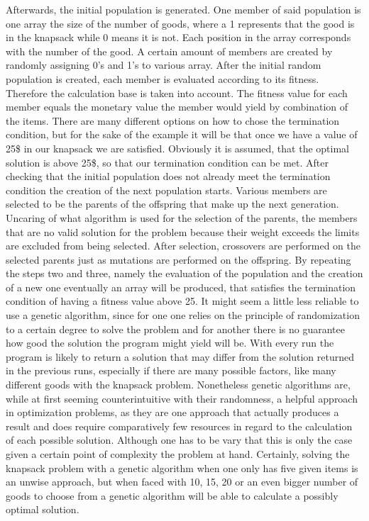 \documentclass[11pt,a4paper]{article}
\begin{document}
Afterwards, the initial population is generated. One member of said population is one array the size of the number of goods, where a 1 represents that the good is in the knapsack while 0 means it is not. Each position in the array corresponds with the number of the good. A certain amount of members are created by randomly assigning 0’s and 1’s to various array. After the initial random population is created, each member is evaluated according to its fitness. Therefore the calculation base is taken into account. The fitness value for each member equals the monetary value the member would yield by combination of the items.
There are many different options on how to chose the termination condition, but for the sake of the example it will be that once we have a value of 25\$ in our knapsack we are satisfied. Obviously it is assumed, that the optimal solution is above 25\$, so that our termination condition can be met.
After checking that the initial population does not already meet the termination condition the creation of the next population starts. Various members are selected to be the parents of the offspring that make up the next generation. Uncaring of what algorithm is used for the selection of the parents, the members that are no valid solution for the problem because their weight exceeds the limits are excluded from being selected.
After selection, crossovers are performed on the selected parents just as mutations are performed on the offspring.
By repeating the steps two and three, namely the evaluation of the population and the creation of a new one eventually an array will be produced, that satisfies the termination condition of having a fitness value above 25.
It might seem a little less reliable to use a genetic algorithm, since for one one relies on the principle of randomization to a certain degree to solve the problem and for another there is no guarantee how good the solution the program might yield will be. With every run the program is likely to return a solution that may differ from the solution returned in the previous runs, especially if there are many possible factors, like many different goods with the knapsack problem.
Nonetheless genetic algorithms are, while at first seeming counterintuitive with their randomness, a helpful approach in optimization problems, as they are one approach that actually produces a result and does require comparatively few resources in regard to the calculation of each possible solution. Although one has to be vary that this is only the case given a certain point of complexity the problem at hand.
Certainly, solving the knapsack problem with a genetic algorithm when one only has five given items is an unwise approach, but when faced with 10, 15, 20 or an even bigger number of goods to choose from a genetic algorithm will be able to calculate a possibly optimal solution.


\nocite{*}
\printbibliography
{}
\end{document}
